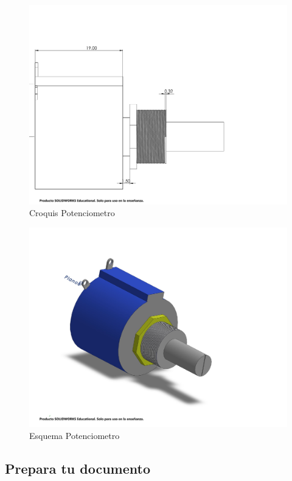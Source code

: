     \begin{figure}[H]
        \centering
        \includegraphics[trim = {10mm 10mm 10mm 10mm},clip,scale=0.05]{25/img/Croquis potenciometro.pdf}
        \caption{Croquis Potenciometro}
        \label{fig:lcd-16x2}
    \end{figure}
    \begin{figure}[H]
        \centering
        \includegraphics[trim = {10mm 10mm 10mm 10mm},clip,scale=0.2]{25/img/Potenciometro.pdf}
        \caption{Esquema Potenciometro}
        \label{fig:lcd-16x2}
    \end{figure}
    \subsection{Prepara tu documento}
    
